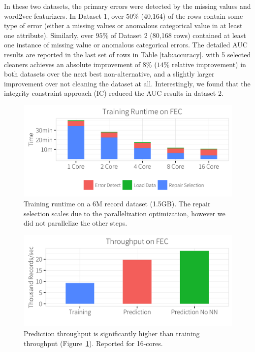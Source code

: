 In these two datasets, the primary errors were detected by the missing values and word2vec featurizers. 
In Dataset 1, over 50\% (40,164) of the rows contain some type of error (either a missing values or anomalous categorical value in at least one attribute).
Similarly, over $95\%$ of Dataset 2 (80,168  rows) contained at least one instance of missing value or anomalous categorical errors.  The detailed AUC results are reported in the last set of rows in  Table \ref{tab:accuracy}.
\sys with 5 selected cleaners achieves an absolute improvement of 8\% ($14\%$ relative improvement) in both datasets over the next best non-\sys alternative, and a slightly larger improvement over not cleaning the dataset at all.
Interestingly, we found that the integrity constraint approach (IC) reduced the AUC results in dataset 2.


\begin{figure}[t]
\centering
\includegraphics[width=0.8\columnwidth]{exp/runtime.png}
\caption{Training runtime on a 6M record dataset (1.5GB). The repair selection scales due to the parallelization optimization, however we did not parallelize the other steps.\label{exp:runtime}}
\end{figure}

\begin{figure}[t]
\centering
\includegraphics[width=0.8\columnwidth]{exp/runtime2.png}
\caption{Prediction throughput is significantly higher than training throughput (Figure~\ref{exp:runtime}).  Reported for 16-cores.\label{exp:tp}}
\end{figure}

